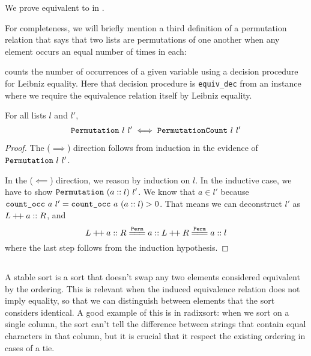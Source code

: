 \documentclass[sigplan,10pt,anonymous,review]{thesis}
\begin{document}
We prove  equivalent to  in
.

For completeness, we will briefly mention a third definition of a
permutation relation that says that two lists are permutations of one
another when any element occurs an equal number of times in each:

 counts the number of occurrences of a given variable
using a decision procedure for Leibniz equality. Here that decision
procedure is \texttt{equiv\_dec} from an  instance where we
require the equivalence relation itself by Leibniz equality.

\begin{theorem}
  For all lists $l$ and $l'$,
  \begin{equation*}
    \texttt{\textup{Permutation}}~l~l' \iff \texttt{\textup{PermutationCount}}~l~l'
  \end{equation*}
\end{theorem}
\begin{proof}
  The ($\implies$) direction follows from induction in the evidence of
  $\texttt{\textup{Permutation}}~l~l'$.

  In the ($\impliedby$) direction, we reason by induction on $l$. In
  the inductive case, we have to show $\texttt{\textup{Permutation}}~(a::l)~l'$.
  We know that $a \in l'$ because $\texttt{\textup{count\_occ}}~a~l' =
  \texttt{\textup{count\_occ}}~a~(a::l) > 0$. That means we can deconstruct $l'$
  as $L \mathbin{+\mkern-3mu+} a :: R$, and
  \begin{equation*}
    L \dplus a :: R \eqperm a :: L \dplus R \eqperm a :: l
  \end{equation*}
  where the last step follows from the induction hypothesis.
\end{proof}

\subsection{}
\label{subsec:stable}

A stable sort is a sort that doesn't swap any two elements considered
equivalent by the ordering. This is relevant when the induced
equivalence relation does not imply equality, so that we can
distinguish between elements that the sort considers identical. A good
example of this is in radixsort: when we sort on a single column, the
sort can't tell the difference between strings that contain equal
characters in that column, but it is crucial that it respect the
existing ordering in cases of a tie.
\end{document}
